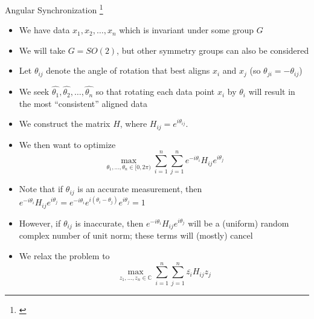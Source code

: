 \begin{frame}{Angular Synchronization \let\thefootnote\relax\footnote{\cite{singer2011angular}}}

    {\scriptsize
    \begin{itemize}
        \item We have data $x_1, x_2, \dots, x_n$ which is invariant under some group $G$

        \item We will take $G = SO(2)$, but other symmetry groups can also be considered

        \item Let $\theta_{ij}$ denote the angle of rotation that best aligns $x_i$ and $x_j$ (so $\theta_{ji} = -\theta_{ij}$)

        \item We seek $\hat{\theta_1}, \hat{\theta_2}, \dots, \hat{\theta_n}$ so that rotating each data point $x_i$ by $\theta_i$ will result in the most ``consistent'' aligned data

        \item We construct the matrix $H$, where $H_{ij} = e^{i \theta_{ij}}$.

        \item We then want to optimize
        $$ \max_{\theta_1, \dots, \theta_n \in [0, 2\pi)} \sum_{i=1}^{n}\sum_{j=1}^{n} e^{-i \theta_i}H_{ij} e^{i \theta_j}$$


        \item Note that if $\theta_{ij}$ is an accurate measurement, then
        $e^{-i \theta_i}H_{ij} e^{i \theta_j} = e^{-i \theta_i}e^{i (\theta_i-\theta_j)} e^{i \theta_j} = 1$

        \item However, if $\theta_{ij}$ is inaccurate, then $e^{-i \theta_i}H_{ij} e^{i \theta_j}$ will be a (uniform) random complex number of unit norm; these terms will (mostly) cancel

        \item We relax the problem to
        $$\max_{z_1, \dots, z_n \in \mathbb{C}} \sum_{i=1}^{n}\sum_{j=1}^{n} \overline{z_i} H_{ij} z_j $$
    \end{itemize}
    \par}
\end{frame}

